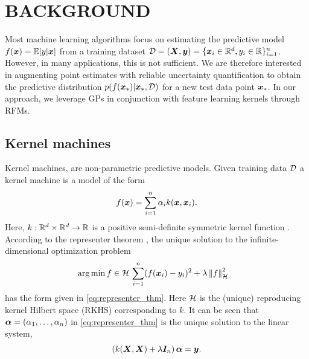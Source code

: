 \section{BACKGROUND}

Most machine learning algorithms focus on estimating the predictive model $f({\bm{x}})=\mathbb{E}[y|{\bm{x}}]$ from a training dataset ${\mathcal{D}}=({\bm{X}},{\bm{y}})=\{{\bm{x}}_i\in\mathbb{R}^d,y_i\in\mathbb{R}\}_{i=1}^n$. However, in many applications, this is not sufficient. We are therefore interested in augmenting point estimates with reliable uncertainty quantification to obtain the predictive distribution $p(f({\bm{x}}_\ast)|{\bm{x}}_\ast,{\mathcal{D}})$ for a new test data point ${\bm{x}}_\ast$. In our approach, we leverage GPs in conjunction with feature learning kernels through RFMs.



\subsection{Kernel machines}
Kernel machines, \citep{scholkopf2002learning} are non-parametric predictive models. Given training data ${\mathcal{D}}$  a kernel machine is a model of the form
\begin{align}\label{eq:representer_thm}
    f(\bm{x}) = \sum_{i=1}^n\alpha_i k(\bm{x},\bm{x}_i).
\end{align}
Here, $k:\mathbb{R}^d\times \mathbb{R}^d\to\mathbb{R}$ is a positive semi-definite symmetric kernel function \citep{aronszajn1950theory}. According to the representer theorem \citep{kimeldorf1970correspondence}, the unique solution to the infinite-dimensional optimization problem
\begin{align}\label{eq:kernel_regression}
    &\arg\min{f\in{\mathcal{H}}} \, \sum_{i=1}^n (f(\bm{x}_i)-y_i)^2+\lambda\left\|f\right\|_{\mathcal{H}}^2
\end{align}
has the form given in \cref{eq:representer_thm}. Here ${\mathcal{H}}$ is the (unique) reproducing kernel Hilbert space (RKHS) corresponding to $k$. It can be seen that $\bm{\alpha} = (\alpha_1,\ldots,\alpha_n)$ in \cref{eq:representer_thm} is the unique solution to the linear system,
\begin{align}\label{eq:linear_system}
    \left(k({\bm{X}},{\bm{X}})+\lambda {\bm{I}}_n \right)\bm{\alpha}=\bm{y}.
\end{align}





